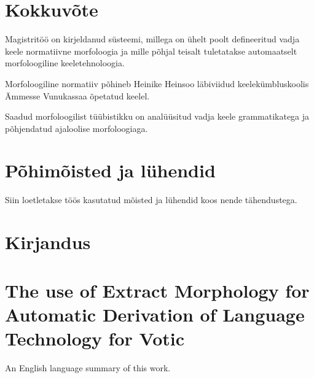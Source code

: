\documentclass[12pt,a4paper]{article}
\begin{document}
\newpage
\section{Kokkuvõte}

Magistritöö on kirjeldanud süsteemi, millega on ühelt poolt defineeritud vadja keele normatiivne morfoloogia ja mille põhjal teisalt tuletatakse automaatselt morfoloogiline keeletehnoloogia.

Morfoloogiline normatiiv põhineb Heinike Heinsoo läbiviidud keelekümbluskoolis Ämmesse Vunukassaa õpetatud keelel.

Saadud morfoloogilist tüübistikku on analüüsitud vadja keele grammatikatega ja põhjendatud ajaloolise morfoloogiaga.








\newpage
\section{Põhimõisted ja lühendid}
Siin loetletakse töös kasutatud mõisted ja lühendid koos nende tähendustega.

\glsaddall
\printglossary[title={},toctitle={}]








\newpage
\section{Kirjandus}
\label{sec:kirjandus}
{
  \printbibliography[heading=none]
}







\newpage
\section{The use of Extract Morphology for Automatic Derivation of Language Technology for Votic}

An English language summary of this work.
\end{document}
